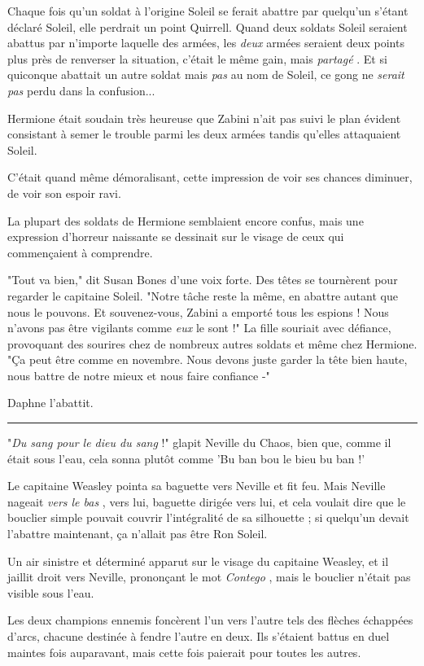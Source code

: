 Chaque fois qu'un soldat à l'origine Soleil se ferait abattre par quelqu'un s'étant déclaré Soleil, elle perdrait un point Quirrell. Quand deux soldats Soleil seraient abattus par n'importe laquelle des armées, les \emph{deux}  armées seraient deux points plus près de renverser la situation, c'était le même gain, mais \emph{partagé} . Et si quiconque abattait un autre soldat mais \emph{pas } au nom de Soleil, ce gong ne \emph{serait pas}  perdu dans la confusion...

Hermione était soudain très heureuse que Zabini n'ait pas suivi le plan évident consistant à semer le trouble parmi les deux armées tandis qu'elles attaquaient Soleil.

C'était quand même démoralisant, cette impression de voir ses chances diminuer, de voir son espoir ravi.

La plupart des soldats de Hermione semblaient encore confus, mais une expression d'horreur naissante se dessinait sur le visage de ceux qui commençaient à comprendre.

"Tout va bien," dit Susan Bones d'une voix forte. Des têtes se tournèrent pour regarder le capitaine Soleil. "Notre tâche reste la même, en abattre autant que nous le pouvons. Et souvenez-vous, Zabini a emporté tous les espions ! Nous n'avons pas être vigilants comme \emph{eux}  le sont !" La fille souriait avec défiance, provoquant des sourires chez de nombreux autres soldats et même chez Hermione. "Ça peut être comme en novembre. Nous devons juste garder la tête bien haute, nous battre de notre mieux et nous faire confiance -"

Daphne l'abattit.
\par\noindent\rule{\textwidth}{0.4pt}
"\emph{Du sang pour le dieu du sang}  !" glapit Neville du Chaos, bien que, comme il était sous l'eau, cela sonna plutôt comme 'Bu ban bou le bieu bu ban !'

Le capitaine Weasley pointa sa baguette vers Neville et fit feu. Mais Neville nageait \emph{vers le bas} , vers lui, baguette dirigée vers lui, et cela voulait dire que le bouclier simple pouvait couvrir l'intégralité de sa silhouette ; si quelqu'un devait l'abattre maintenant, ça n'allait pas être Ron Soleil.

Un air sinistre et déterminé apparut sur le visage du capitaine Weasley, et il jaillit droit vers Neville, prononçant le mot \emph{Contego} , mais le bouclier n'était pas visible sous l'eau.

Les deux champions ennemis foncèrent l'un vers l'autre tels des flèches échappées d'arcs, chacune destinée à fendre l'autre en deux. Ils s'étaient battus en duel maintes fois auparavant, mais cette fois paierait pour toutes les autres.

